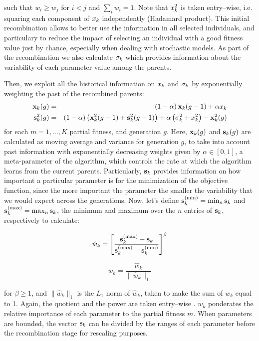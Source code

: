 \noindent such that $w_i \geq w_j$ for $i<j$ and $\sum_iw_i =1$. Note that $x_k^2$ is taken entry--wise, i.e. squaring each component of $x_k$ independently (Hadamard product). This initial recombination allows to better use the information in all selected individuals, and particulary to reduce the impact of selecting an individual with a good fitness value just by chance, especially when dealing with stochastic models. As part of the recombination we also calculate $\sigma_k$ which provides information about the variability of each parameter value among the parents.

Then, we exploit all the historical information on $x_k$ and $\sigma_k$ by exponentially weighting the past of the recombined parents:
\begin{eqnarray}
\textbf{x}_k(g) & = & \left(1-\alpha\right)\textbf{x}_k(g-1) + \alpha x_k\\
\textbf{s}_k^2 (g) & = & \left(1-\alpha\right)\left(\textbf{x}_k^2(g-1) + \textbf{s}_k^2(g-1)\right) + \alpha\left(\sigma_k^2 + x_k^2\right) - \textbf{x}_k^2(g) 
\end{eqnarray}
\noindent for each $m=1, \dots, K$ partial fitness, and generation $g$. Here, $\textbf{x}_k(g)$ and $\textbf{s}_k(g)$ are calculated as moving average and variance for generation $g$, to take into account past information with exponentially decreasing weights given by $\alpha \in [0,1]$, a meta-parameter of the algorithm, which controls the rate at which the algorithm learns from the current parents. Particularly, $\textbf{s}_k$ provides information on how important a particular parameter is for the minimization of the objective function, since the more important the parameter the smaller the variability that we would expect across the generations.
Now, let's define $\textbf{s}^{(\min)}_k=\min_n\textbf{s}_k$ and $\textbf{s}^{(\max)}_k=\max_n\textbf{s}_k$, the minimum and maximum over the $n$ entries of $\textbf{s}_k$, respectively to calculate:

\begin{equation}
\hat{w}_k = \left[\frac{\textbf{s}^{(\max)}_k-\textbf{s}_k}{\textbf{s}^{(\max)}_k-\textbf{s}^{(\min)}_k}\right]^\beta
\end{equation} 

\begin{equation}
w_k =\frac{\hat{w}_k}{\|\hat{w}_k\|_1} 
\end{equation} 


\noindent for $\beta \geq 1 $, and $\|\hat{w}_k\|_1$ is the $L_1$ norm of $\hat{w}_k$, taken to make the sum of $w_k$ equal to 1. Again, the quotient and the power are taken entry--wise . $w_k$ ponderates the relative importance of each parameter to the partial fitness $m$. When parameters are bounded, the vector $\textbf{s}_k$ can be divided by the ranges of each parameter before the recombination stage for rescaling purposes.

